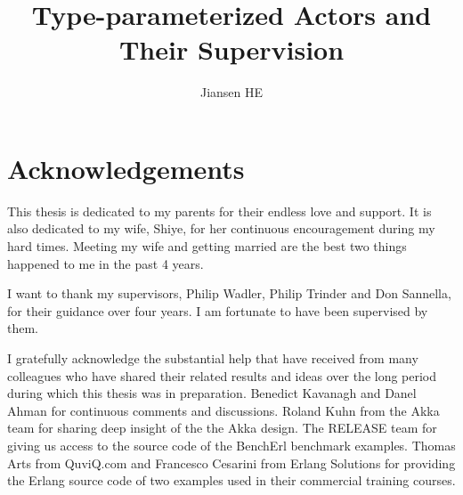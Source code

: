 \documentclass[mphil, 12 pt]{csthesis}
\begin{document}

\title{Type-parameterized Actors and Their Supervision}
\author{Jiansen HE}

\maketitle 



\section*{Acknowledgements}

This thesis is dedicated to my parents for their endless love and support.
It is also dedicated to my wife, Shiye, for her continuous encouragement
during my hard times.  Meeting my wife and getting married are the best
two things happened to me in the past 4 years.

I want to thank my supervisors, Philip Wadler, Philip Trinder and Don Sannella,
for their guidance over four years.  I am fortunate to have been supervised
by them.

I gratefully acknowledge the substantial help that have received from many 
colleagues who have shared their related results and ideas over the long period 
during which this thesis was in preparation. Benedict Kavanagh and Danel Ahman 
for continuous comments and discussions. Roland Kuhn from the Akka team for 
sharing deep insight of the the Akka design.  
The RELEASE team for giving us access to the source code of the BenchErl 
benchmark examples.  Thomas Arts from QuviQ.com and Francesco Cesarini from 
Erlang Solutions for providing the Erlang source code of two examples used 
in their commercial training courses.




\setcounter{tocdepth}{1}
\standarddeclaration
\oneandahalfspace
\tableofcontents

\end{document}
